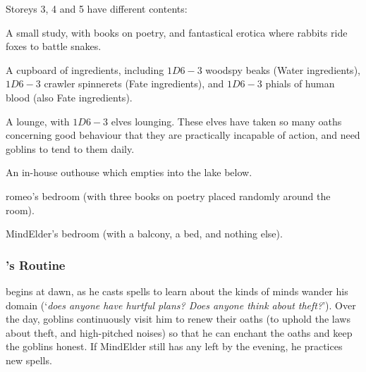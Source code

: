 \begin{multicols}{2}
Storeys 3, 4 and 5 have different contents:

\null
\begin{dlist}
  \item
  A small study, with books on poetry, and fantastical erotica where rabbits ride foxes to battle snakes.
  \item
  A cupboard of \glspl{ingredient}, including $1D6-3$ woodspy beaks (Water \glspl{ingredient}), $1D6-3$ \gls{crawler} spinnerets (Fate \glspl{ingredient}), and $1D6-3$ phials of human blood (also Fate \glspl{ingredient}).
  \item
  A lounge, with $1D6-3$ elves lounging.
  These elves have taken so many oaths concerning good behaviour that they are practically incapable of action, and need goblins to tend to them daily.
  \item
  An in-house outhouse which empties into the lake below.
  \item
  \gls{romeo}'s bedroom (with three books on poetry placed randomly around the room).
  \item
  \gls{MindElder}'s bedroom (with a balcony, a bed, and nothing else).
\end{dlist}

\subsubsection{'s Routine}
begins at dawn, as he casts spells to learn about the kinds of minds wander his domain (`\textit{does anyone have hurtful plans?  Does anyone think about theft?}').
Over the day, goblins continuously visit him to renew their oaths (to uphold the laws about theft, and high-pitched noises) so that he can enchant the oaths and keep the goblins honest.
If \gls{MindElder} still has any  left by the evening, he practices new spells.

\MindElder

\showStdSpells

\end{multicols}

